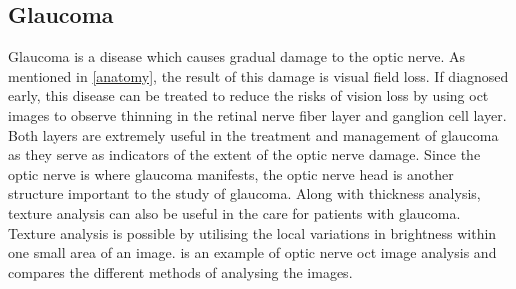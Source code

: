 \subsection{Glaucoma}
Glaucoma is a disease which causes gradual damage to the optic
nerve.  As mentioned in \cref{anatomy}, the result of this damage is visual
field loss.\cite{mbib_6} If diagnosed early, this disease can be treated to
reduce the risks of vision loss by using \Gls{oct} images to observe thinning in
the retinal nerve fiber layer and ganglion cell layer.  Both layers are extremely
useful in the treatment and management of glaucoma as they serve as
indicators of the extent of the optic nerve damage.\cite{mbib_4}
Since the optic nerve is where glaucoma manifests, the optic nerve head 
is another structure important to the study of glaucoma. \cite{mbib_4}
Along with thickness analysis, texture analysis can also be useful in the 
care for patients with glaucoma. Texture analysis is possible by utilising 
the local variations in brightness within one small area of an image.
\cite{mbib_12}  is an example of optic nerve 
\Gls{oct} image analysis and compares the different methods of analysing 
the images.

